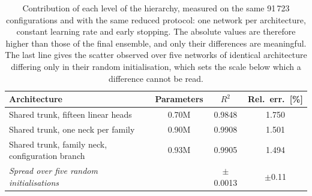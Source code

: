 \begin{table}[htbp]
\centering
\caption{Contribution of each level of the hierarchy, measured on the same
91\,723 configurations and with the same reduced protocol: one network per
architecture, constant learning rate and early stopping. The absolute values are
therefore higher than those of the final ensemble, and only their differences
are meaningful. The last line gives the scatter observed over five networks of
identical architecture differing only in their random initialisation, which sets
the scale below which a difference cannot be read.}
\label{tab:ablation}
\begin{tabular}{lccc}
\hline
Architecture & Parameters & $R^2$ & Rel.\ err.\ [\%] \\ \hline
    Shared trunk, fifteen linear heads & 0.70M & 0.9848 & 1.750 \\
    Shared trunk, one neck per family & 0.90M & 0.9908 & 1.501 \\
    Shared trunk, family neck, configuration branch & 0.93M & 0.9905 & 1.494 \\
\hline
    \emph{Spread over five random initialisations} & & $\pm$0.0013 & $\pm$0.11 \\ \hline
\end{tabular}
\end{table}
